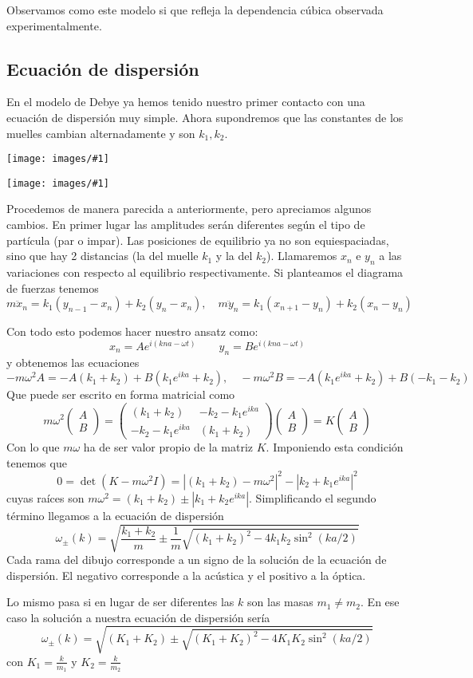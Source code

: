\documentclass[leqno]{article}
\newcommand{\incimg}[1]{%
\center
\texttt{[image: images/\#1]}
}
\begin{document}
Observamos como este modelo si que refleja la dependencia cúbica observada experimentalmente.

\subsection{Ecuación de dispersión}
En el modelo de Debye ya hemos tenido nuestro primer contacto con una ecuación de dispersión muy simple. Ahora supondremos que las constantes de los muelles cambian alternadamente y son $k_1, k_2$.

\begin{minipage}{0.49\textwidth}
\incimg{prob2_3chain.png}
\end{minipage}
\begin{minipage}{0.49\textwidth}
\incimg{prob2_3.png}
\end{minipage}

Procedemos de manera parecida a anteriormente, pero apreciamos algunos cambios. En primer lugar las amplitudes serán diferentes según el tipo de partícula (par o impar). Las posiciones de equilibrio ya no son equiespaciadas, sino que hay 2 distancias (la del muelle $k_1$ y la del $k_2$). Llamaremos $x_n$ e  $y_n$ a las variaciones con respecto al equilibrio respectivamente. Si planteamos el diagrama de fuerzas tenemos
\[
m\ddot{x}_n = k_1(y_{n-1}-x_n)+k_2(y_n-x_n), \quad 
m\ddot{y}_n = k_1(x_{n+1}-y_n)+k_2(x_n-y_n)
\] 

Con todo esto podemos hacer nuestro ansatz como:
\[
x_n = A e^{i(kna-\omega t)} \qquad
y_n = B e^{i(kna-\omega t)}
\] 
y obtenemos las ecuaciones
\[
-m\omega ^2 A = -A(k_1+k_2)+ B(k_1e^{ika}+k_2), \quad 
-m\omega ^2 B = -A(k_1e^{ika}+k_2)+ B(-k_1-k_2)
\] 
Que puede ser escrito en forma matricial como
\[
  m\omega ^2 \begin{pmatrix} A\\B \end{pmatrix} = \begin{pmatrix} (k_1+k_2) & -k_2 -k_1e^{ika} \\ -k_2-k_1e^{ika} & (k_1+k_2) \end{pmatrix}  \begin{pmatrix} A\\B \end{pmatrix} = K\begin{pmatrix} A\\B \end{pmatrix} 
\] 
Con lo que $m\omega $ ha de ser valor propio de la matriz $K$. Imponiendo esta condición tenemos que
 \[
0 = \det(K-m\omega ^2I) = |(k_1+k_2)-m\omega ^2|^2 - |k_2 +k_1e^{ika}|^2
\] 
cuyas raíces son $m\omega^2 = (k_1+k_2) \pm |k_1+k_2e^{ika}|$. Simplificando el segundo término llegamos a la ecuación de dispersión 
\[
  \boxed{\omega _{\pm}(k) = \sqrt{ \frac{k_1+k_2}{m}\pm \frac{1}{m} \sqrt{(k_1+k_2)^2-4k_1k_2\sin^2(ka / 2)} } }
\] 
Cada rama del dibujo corresponde a un signo de la solución de la ecuación de dispersión. El negativo corresponde a la acústica y el positivo a la óptica.

Lo mismo pasa si en lugar de ser diferentes las $k$ son las masas  $m_1\neq m_2$. En ese caso la solución a nuestra ecuación de dispersión sería
\[
  \boxed{\omega _{\pm}(k) = \sqrt{ (K_1+K_2)\pm \sqrt{(K_1+K_2)^2-4K_1K_2\sin^2(ka / 2)} } }
\] 
con $K_1= \frac{k}{m_1}$ y $K_2 = \frac{k}{m_2}$
\end{document}

